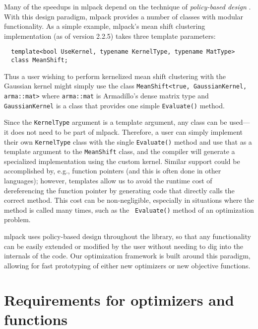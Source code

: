 \documentclass{article}
\begin{document}
Many of the speedups in mlpack depend on the technique of {\it policy-based
design} \cite{Alexandrescu2001}.  With this design paradigm, mlpack
provides a number of classes with modular functionality.  As a simple example,
mlpack's mean shift clustering implementation (as of version 2.2.5) takes three
template parameters:

\vspace*{-0.4em}
\begin{verbatim}
  template<bool UseKernel, typename KernelType, typename MatType>
  class MeanShift;
\end{verbatim}
\vspace*{-0.4em}

Thus a user wishing to perform kernelized mean shift clustering with the
Gaussian kernel might simply use the class
{\footnotesize \texttt{MeanShift<true, GaussianKernel, arma::mat>}}
\noindent where {\tt arma::mat} is Armadillo's dense matrix type and {\tt
GaussianKernel} is a class that provides one simple {\tt Evaluate()} method.

Since the {\tt KernelType} argument is a template argument, any class can be
used---it does not need to be part of mlpack.  Therefore, a user can simply
implement their own {\tt KernelType} class with the single {\tt Evaluate()}
method and use that as a template argument to the {\tt MeanShift} class, and
the compiler will generate a specialized implementation using the custom
kernel.  Similar support could be accomplished by, e.g., function pointers (and
this is often done in other languages); however, templates allow us to avoid
the runtime cost of dereferencing the function pointer by generating code that
directly calls the correct method. This cost can be non-negligible, especially
in situations where the method is called many times, such as the {\tt
Evaluate()} method of an optimization problem.

mlpack uses policy-based design throughout the library, so that any
functionality can be easily extended or modified by the user without needing to
dig into the internals of the code.  Our optimization framework is built around
this paradigm, allowing for fast prototyping of either new optimizers or new
objective functions.

\vspace*{-0.3em}
\section{Requirements for optimizers and functions}
\vspace*{-0.2em}
\end{document}
